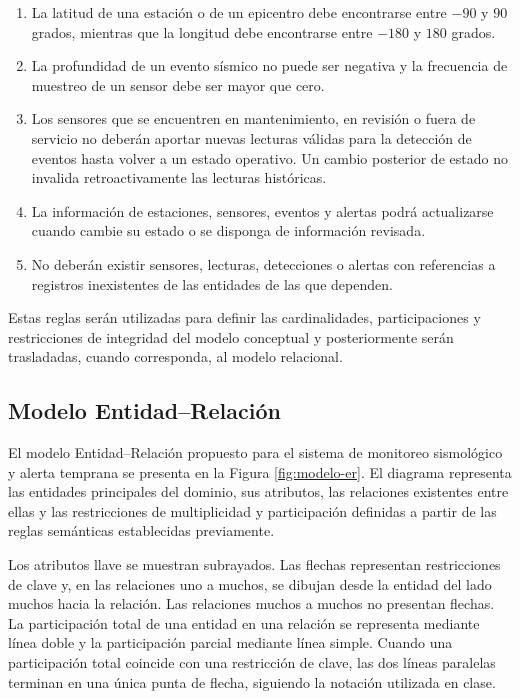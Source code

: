 \documentclass[12pt,a4paper]{article}
\begin{document}
\begin{enumerate}
    \item La latitud de una estación o de un epicentro debe encontrarse entre $-90$ y $90$ grados, mientras que la longitud debe encontrarse entre $-180$ y $180$ grados.

    \item La profundidad de un evento sísmico no puede ser negativa y la frecuencia de muestreo de un sensor debe ser mayor que cero.

    \item Los sensores que se encuentren en mantenimiento, en revisión o fuera de servicio no deberán aportar nuevas lecturas válidas para la detección de eventos hasta volver a un estado operativo. Un cambio posterior de estado no invalida retroactivamente las lecturas históricas.

    \item La información de estaciones, sensores, eventos y alertas podrá actualizarse cuando cambie su estado o se disponga de información revisada.

    \item No deberán existir sensores, lecturas, detecciones o alertas con referencias a registros inexistentes de las entidades de las que dependen.

\end{enumerate}

Estas reglas serán utilizadas para definir las cardinalidades, participaciones y restricciones de integridad del modelo conceptual y posteriormente serán trasladadas, cuando corresponda, al modelo relacional.


\subsection{Modelo Entidad--Relación}

El modelo Entidad--Relación propuesto para el sistema de monitoreo sismológico y alerta temprana se presenta en la Figura \ref{fig:modelo-er}. El diagrama representa las entidades principales del dominio, sus atributos, las relaciones existentes entre ellas y las restricciones de multiplicidad y participación definidas a partir de las reglas semánticas establecidas previamente.

Los atributos llave se muestran subrayados. Las flechas representan restricciones de clave y, en las relaciones uno a muchos, se dibujan desde la entidad del lado muchos hacia la relación. Las relaciones muchos a muchos no presentan flechas. La participación total de una entidad en una relación se representa mediante línea doble y la participación parcial mediante línea simple. Cuando una participación total coincide con una restricción de clave, las dos líneas paralelas terminan en una única punta de flecha, siguiendo la notación utilizada en clase.
\end{document}
